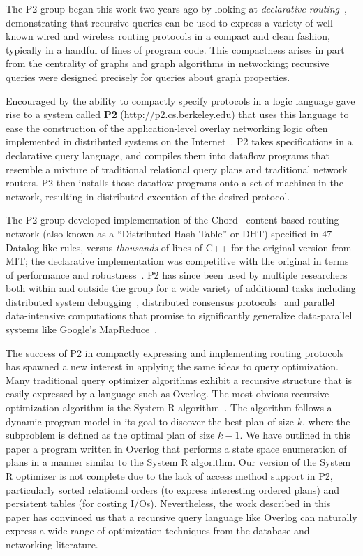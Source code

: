 The P2
group began this work two years ago by looking at {\em declarative
  routing}~\cite{loo-sigcomm05}, demonstrating that recursive queries
can be used to express a variety of well-known wired and wireless
routing protocols in a compact and clean fashion, typically in a
handful of lines of program code.  This compactness arises in part
from the centrality of graphs and graph algorithms in networking;
recursive queries were designed precisely for queries about graph
properties.  

Encouraged by the ability to compactly specify protocols in a logic
language gave rise to a system called {\bf P2}
(\url{http://p2.cs.berkeley.edu}) that uses this language to ease the
construction of the application-level overlay networking logic often
implemented in distributed systems on the Internet~\cite{loo-sosp05}.
P2 takes specifications in a declarative query language, and compiles
them into dataflow programs that resemble a mixture of traditional
relational query plans and traditional network routers.  P2 then
installs those dataflow programs onto a set of machines in the
network, resulting in distributed execution of the desired protocol.

The P2 group developed implementation of the Chord~\cite{chord}
content-based routing network (also known as a ``Distributed Hash
Table'' or DHT) specified in 47 Datalog-like rules, versus {\em
  thousands} of lines of C++ for the original version from MIT; the
declarative implementation was competitive with the original in terms
of performance and robustness~\cite{loo-sosp05}.  P2 has since been
used by multiple researchers both within and outside the group for a
wide variety of additional tasks including distributed system
debugging~\cite{singh-eurosys06}, distributed consensus
protocols~\cite{paxon} and parallel data-intensive computations that
promise to significantly generalize data-parallel systems like
Google's MapReduce~\cite{mapreduce}.  

The success of P2 in compactly expressing and implementing 
routing protocols has spawned a new interest in applying the same 
ideas to query optimization.  Many traditional query optimizer
algorithms exhibit a recursive structure that is easily expressed by
a language such as Overlog. The most obvious recursive optimization
algorithm is the System R algorithm~\cite{selinger}.  The algorithm follows 
a dynamic program model in its goal to discover the best plan of size $k$,
where the subproblem is defined as the optimal plan of size $k - 1$. We
have outlined in this paper a program written in Overlog that performs a
state space enumeration of plans in a manner similar to the System R algorithm.
Our version of the System R optimizer is not complete due to the lack of
access method support in P2, particularly sorted relational orders (to express
interesting ordered plans) and persistent tables (for costing I/Os). Nevertheless,
the work described in this paper has convinced us that a recursive query 
language like Overlog can naturally express 
a wide range of optimization techniques from the database and networking 
literature.

